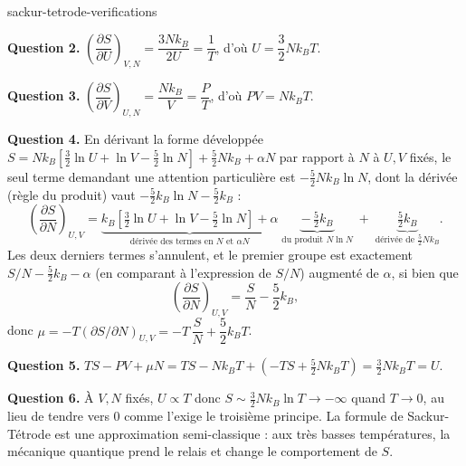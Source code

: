 \begin{exo}{sackur-tetrode-verifications}
\begin{solution}
\textbf{Question 2.} $\left(\dfrac{\partial S}{\partial U}\right)_{V,N} = \dfrac{3Nk_B}{2U} = \dfrac{1}{T}$, d'où $U = \dfrac{3}{2}Nk_BT$.

\textbf{Question 3.} $\left(\dfrac{\partial S}{\partial V}\right)_{U,N} = \dfrac{Nk_B}{V} = \dfrac{P}{T}$, d'où $PV = Nk_BT$.

\textbf{Question 4.} En dérivant la forme développée $S = Nk_B\!\left[\tfrac{3}{2}\ln U + \ln V - \tfrac{5}{2}\ln N\right] + \tfrac{5}{2}Nk_B + \alpha N$ par rapport à $N$ à $U,V$ fixés, le seul terme demandant une attention particulière est $-\tfrac{5}{2}Nk_B\ln N$, dont la dérivée (règle du produit) vaut $-\tfrac{5}{2}k_B\ln N - \tfrac{5}{2}k_B$ :
\[
\left(\frac{\partial S}{\partial N}\right)_{U,V} = \underbrace{k_B\!\left[\tfrac{3}{2}\ln U + \ln V - \tfrac{5}{2}\ln N\right] + \alpha}_{\text{dérivée des termes en } N \text{ et } \alpha N} \;\underbrace{-\,\tfrac{5}{2}k_B}_{\text{du produit } N\ln N} \;+\; \underbrace{\tfrac{5}{2}k_B}_{\text{dérivée de } \frac{5}{2}Nk_B}.
\]
Les deux derniers termes s'annulent, et le premier groupe est exactement $S/N - \tfrac{5}{2}k_B - \alpha$ (en comparant à l'expression de $S/N$) augmenté de $\alpha$, si bien que
\[
\left(\frac{\partial S}{\partial N}\right)_{U,V} = \frac{S}{N} - \frac{5}{2}k_B,
\]
donc $\mu = -T\left(\partial S/\partial N\right)_{U,V} = -T\,\dfrac{S}{N} + \dfrac{5}{2}k_BT$.

\textbf{Question 5.} $TS - PV + \mu N = TS - Nk_BT + \left(-TS + \tfrac{5}{2}Nk_BT\right) = \tfrac{3}{2}Nk_BT = U$. \checkmark

\textbf{Question 6.} À $V,N$ fixés, $U \propto T$ donc $S \sim \tfrac{3}{2}Nk_B\ln T \to -\infty$ quand $T\to0$, au lieu de tendre vers $0$ comme l'exige le troisième principe. La formule de Sackur-Tétrode est une approximation semi-classique : aux très basses températures, la mécanique quantique prend le relais et change le comportement de $S$.
\end{solution}
\end{exo}

